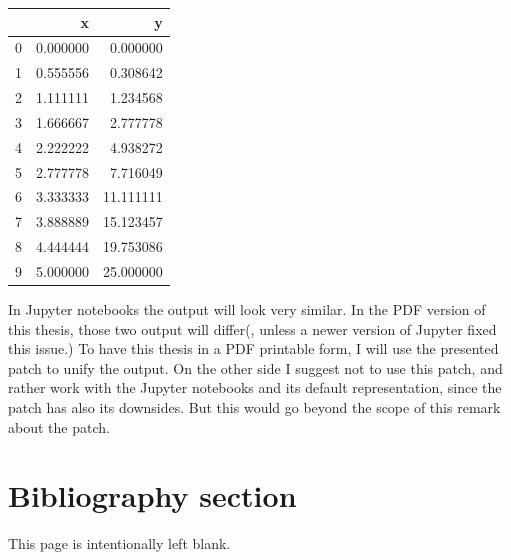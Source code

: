 \documentclass[11pt]{article}
\begin{document}
    
    \begin{center}
    {\begin{tabular}{lrr}
\toprule
{} &         x &          y \\
\midrule
0 &  0.000000 &   0.000000 \\
1 &  0.555556 &   0.308642 \\
2 &  1.111111 &   1.234568 \\
3 &  1.666667 &   2.777778 \\
4 &  2.222222 &   4.938272 \\
5 &  2.777778 &   7.716049 \\
6 &  3.333333 &  11.111111 \\
7 &  3.888889 &  15.123457 \\
8 &  4.444444 &  19.753086 \\
9 &  5.000000 &  25.000000 \\
\bottomrule
\end{tabular}
}
    \end{center}
    

    
    In Jupyter notebooks the output will look very similar. In the PDF
version of this thesis, those two output will differ(, unless a newer
version of Jupyter fixed this issue.) To have this thesis in a PDF
printable form, I will use the presented patch to unify the output. On
the other side I suggest not to use this patch, and rather work with the
Jupyter notebooks and its default representation, since the patch has
also its downsides. But this would go beyond the scope of this remark
about the patch.

    \hypertarget{bibliography-section}{%
\section{Bibliography section}\label{bibliography-section}}

    


    \newpage

This page is intentionally left blank.


    
    
    
\end{document}
